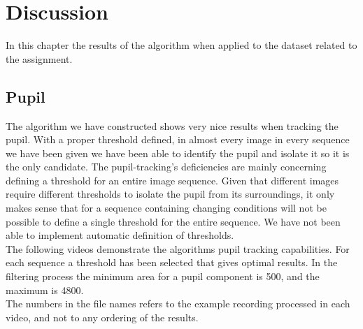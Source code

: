 \section{Discussion}

In this chapter the results of the algorithm when applied to the dataset related to the assignment. 

\subsection{Pupil}
The algorithm we have constructed shows very nice results when tracking the pupil. With a proper threshold defined, in almost every image in every sequence we have been given we have been able to identify the pupil and isolate it so it is the only candidate. The pupil-tracking's deficiencies are mainly concerning defining a threshold for an entire image sequence. Given that different images require different thresholds to isolate the pupil from its surroundings, it only makes sense that for a sequence containing changing conditions will not be possible to define a single threshold for the entire sequence. We have not been able to implement automatic definition of thresholds.\\
The following videos demonstrate the algorithms pupil tracking capabilities. For each sequence a threshold has been selected that gives optimal results. In the filtering process the minimum area for a pupil component is 500, and the maximum is 4800.\\
The numbers in the file names refers to the example recording processed in each video, and not to any ordering of the results.
